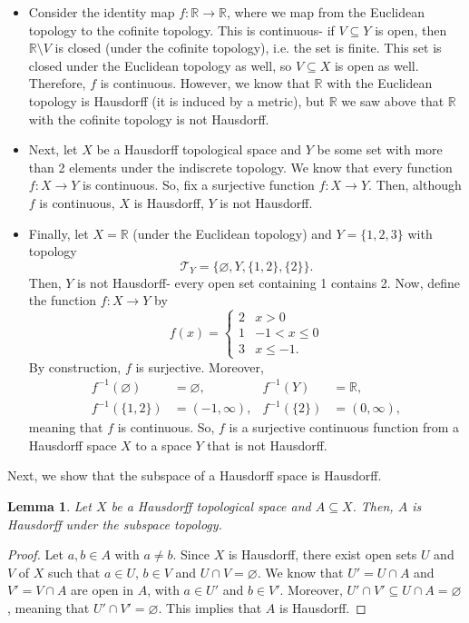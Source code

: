 \documentclass[a4paper, openany]{memoir}
\theoremstyle{definition}
\theoremstyle{plain}
\newtheorem{lemma}[definition]{Lemma}
\begin{document}
\begin{itemize}
    \item Consider the identity map $f: \mathbb{R} \to \mathbb{R}$, where we map from the Euclidean topology to the cofinite topology. This is continuous- if $V \subseteq Y$ is open, then $\mathbb{R} \setminus V$ is closed (under the cofinite topology), i.e. the set is finite. This set is closed under the Euclidean topology as well, so $V \subseteq X$ is open as well. Therefore, $f$ is continuous. However, we know that $\mathbb{R}$ with the Euclidean topology is Hausdorff (it is induced by a metric), but $\mathbb{R}$ we saw above that $\mathbb{R}$ with the cofinite topology is not Hausdorff.
    
    \item Next, let $X$ be a Hausdorff topological space and $Y$ be some set with more than 2 elements under the indiscrete topology. We know that every function $f: X \to Y$ is continuous. So, fix a surjective function $f: X \to Y$. Then, although $f$ is continuous, $X$ is Hausdorff, $Y$ is not Hausdorff.
    
    \item Finally, let $X = \mathbb{R}$ (under the Euclidean topology) and $Y = \{1, 2, 3\}$ with topology
    \[\mathcal{T}_Y = \{\varnothing, Y, \{1, 2\}, \{2\}\}.\]
    Then, $Y$ is not Hausdorff- every open set containing 1 contains 2. Now, define the function $f: X \to Y$ by
    \[f(x) = \begin{cases}
    2 & x > 0 \\
    1 & -1 < x \leqslant 0 \\
    3 & x \leqslant -1.
    \end{cases}\]
    By construction, $f$ is surjective. Moreover,
    \begin{align*}
        f^{-1}(\varnothing) &= \varnothing,&  f^{-1}(Y) &= \mathbb{R}, \\
        f^{-1}(\{1, 2\}) &= (-1, \infty),& f^{-1}(\{2\}) &= (0, \infty),
    \end{align*}
    meaning that $f$ is continuous. So, $f$ is a surjective continuous function from a Hausdorff space $X$ to a space $Y$ that is not Hausdorff.
\end{itemize}
Next, we show that the subspace of a Hausdorff space is Hausdorff.
\begin{lemma}
Let $X$ be a Hausdorff topological space and $A \subseteq X$. Then, $A$ is Hausdorff under the subspace topology.
\end{lemma}
\begin{proof}
Let $a, b \in A$ with $a \neq b$. Since $X$ is Hausdorff, there exist open sets $U$ and $V$ of $X$ such that $a \in U$, $b \in V$ and $U \cap V = \varnothing$. We know that $U' = U \cap A$ and $V' = V \cap A$ are open in $A$, with $a \in U'$ and $b \in V'$. Moreover, $U' \cap V' \subseteq U \cap A = \varnothing$, meaning that $U' \cap V' = \varnothing$. This implies that $A$ is Hausdorff.
\end{proof}
\newpage
\end{document}

